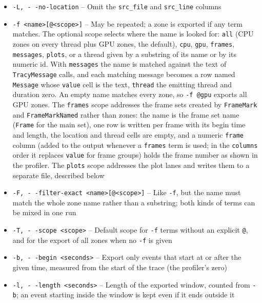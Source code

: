 \documentclass[hidelinks,titlepage,a4paper,twoside]{article}
\begin{document}
\begin{itemize}
  \item \texttt{-L, -\hspace{-1.25ex} -no-location} -- Omit the \texttt{src\_file} and \texttt{src\_line} columns
  \item \texttt{-f <name>[@<scope>]} -- May be repeated; a zone is exported if any term matches. The optional scope selects where the name is looked for: \texttt{all} (CPU zones on every thread plus GPU zones, the default), \texttt{cpu}, \texttt{gpu}, \texttt{frames}, \texttt{messages}, \texttt{plots}, or a thread given by a substring of its name or by its numeric id. With \texttt{messages} the name is matched against the text of \texttt{TracyMessage} calls, and each matching message becomes a row named \texttt{Message} whose \texttt{value} cell is the text, \texttt{thread} the emitting thread and duration zero. An empty name matches every zone, so \texttt{-f @gpu} exports all GPU zones. The \texttt{frames} scope addresses the frame sets created by \texttt{FrameMark} and \texttt{FrameMarkNamed} rather than zones: the name is the frame set name (\texttt{Frame} for the main set), one row is written per frame with its begin time and length, the location and thread cells are empty, and a numeric \texttt{frame} column (added to the output whenever a \texttt{frames} term is used; in the \texttt{columns} order it replaces \texttt{value} for frame groups) holds the frame number as shown in the profiler. The \texttt{plots} scope addresses the plot lanes and writes them to a separate file, described below
  \item \texttt{-F, -\hspace{-1.25ex} -filter-exact <name>[@<scope>]} -- Like \texttt{-f}, but the name must match the whole zone name rather than a substring; both kinds of terms can be mixed in one run
  \item \texttt{-T, -\hspace{-1.25ex} -scope <scope>} -- Default scope for \texttt{-f} terms without an explicit \texttt{@}, and for the export of all zones when no \texttt{-f} is given
  \item \texttt{-b, -\hspace{-1.25ex} -begin <seconds>} -- Export only events that start at or after the given time, measured from the start of the trace (the profiler's zero)
  \item \texttt{-l, -\hspace{-1.25ex} -length <seconds>} -- Length of the exported window, counted from \texttt{-b}; an event starting inside the window is kept even if it ends outside it

\end{itemize}
\end{document}
